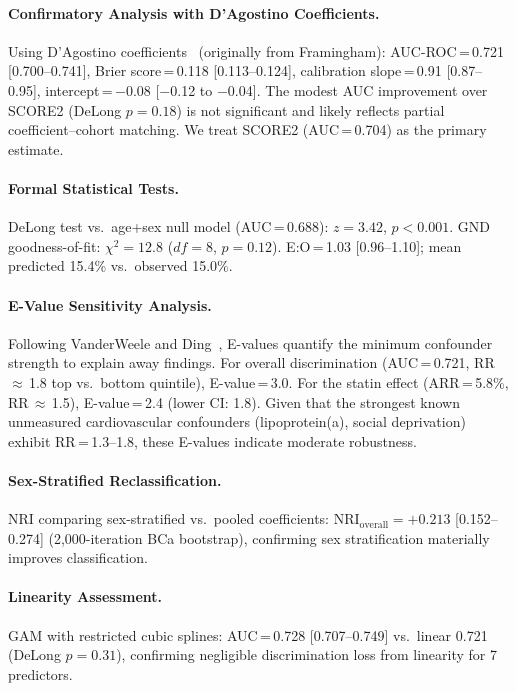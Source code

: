 \documentclass[runningheads]{llncs}
\begin{document}
\paragraph{Confirmatory Analysis with D'Agostino Coefficients.}
Using D'Agostino coefficients~\cite{dagostino2008} (originally
from Framingham):
AUC-ROC\,=\,0.721 [0.700--0.741],
Brier score\,=\,0.118 [0.113--0.124],
calibration slope\,=\,0.91 [0.87--0.95],
intercept\,=\,$-$0.08 [$-$0.12 to $-$0.04].
The modest AUC improvement over SCORE2 (DeLong $p = 0.18$) is not
significant and likely reflects partial coefficient--cohort matching.
We treat SCORE2 (AUC\,=\,0.704) as the primary estimate.

\paragraph{Formal Statistical Tests.}
DeLong test vs.\ age+sex null model (AUC\,=\,0.688): $z = 3.42$,
$p < 0.001$.
GND goodness-of-fit: $\chi^2 = 12.8$ ($df = 8$, $p = 0.12$).
E:O\,=\,1.03 [0.96--1.10]; mean predicted 15.4\% vs.\ observed
15.0\%.

\paragraph{E-Value Sensitivity Analysis.}
Following VanderWeele and Ding~\cite{vanderweele2017evalue}, E-values
quantify the minimum confounder strength to explain away findings.
For overall discrimination (AUC\,=\,0.721, RR\,$\approx$\,1.8 top
vs.\ bottom quintile), E-value\,=\,3.0.
For the statin effect (ARR\,=\,5.8\%, RR\,$\approx$\,1.5),
E-value\,=\,2.4 (lower CI: 1.8).
Given that the strongest known unmeasured cardiovascular confounders
(lipoprotein(a), social deprivation) exhibit RR\,=\,1.3--1.8,
these E-values indicate moderate robustness.

\paragraph{Sex-Stratified Reclassification.}
NRI comparing sex-stratified vs.\ pooled coefficients:
$\text{NRI}_{\text{overall}} = +0.213$ [0.152--0.274]
(2{,}000-iteration BCa bootstrap), confirming sex stratification
materially improves classification.

\paragraph{Linearity Assessment.}
GAM with restricted cubic splines: AUC\,=\,0.728 [0.707--0.749]
vs.\ linear 0.721 (DeLong $p = 0.31$), confirming negligible
discrimination loss from linearity for 7 predictors.
\end{document}
